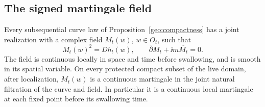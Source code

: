\subsection{The signed martingale field}

\begin{proposition}
\label{geo:martingale}
Every subsequential curve law of Proposition~\ref{geo:compactness}
has a joint realization with a complex field \(M_t(w)\), \(w\in O_t\),
such that
\[
 M_t(w)^2=D h_t(w),\qquad
 \bar\partial M_t+\ii m\overline{M_t}=0.
\]
The field is continuous locally in space and time before swallowing,
and is smooth in its spatial variable. On every protected compact
subset of the live domain, after localization, \(M_t(w)\) is a
continuous martingale in the joint natural filtration of the curve
and field. In particular it is a continuous local martingale at
each fixed point before its swallowing time.
\end{proposition}

